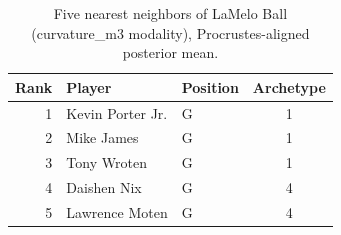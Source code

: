 \begin{table}[htbp]
  \centering\small
  \begin{tabular}{rllc}
    \toprule
    Rank & Player & Position & Archetype \\
    \midrule
    1 & Kevin Porter Jr. & G & 1 \\
    2 & Mike James & G & 1 \\
    3 & Tony Wroten & G & 1 \\
    4 & Daishen Nix & G & 4 \\
    5 & Lawrence Moten & G & 4 \\
    \bottomrule
  \end{tabular}
  \caption{Five nearest neighbors of LaMelo Ball (curvature_m3 modality), Procrustes-aligned posterior mean.}
  \label{tab:LaMelo_Ball_neighbors_curvature_m3}
\end{table}

